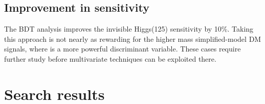 \subsection{Improvement in sensitivity} 
The BDT analysis improves the invisible Higgs(125) sensitivity by 10\%.
Taking this approach is not nearly as rewarding for the higher mass simplified-model DM signals, where \met is a more powerful discriminant variable.
These cases require further study before multivariate techniques can be exploited there.

\section{Search results}
